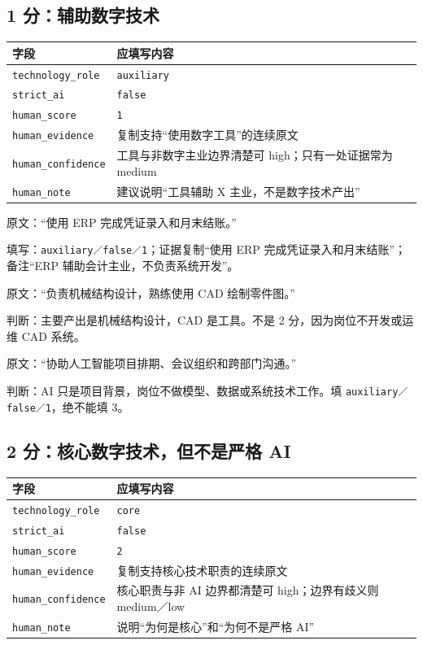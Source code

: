 \documentclass[11pt,a4paper,fontset=none]{ctexart}
\newcommand{\field}[1]{\nolinkurl{#1}}
\begin{document}
\subsection{1 分：辅助数字技术}

\noindent\begin{tabularx}{\textwidth}{L{3.1cm}Y}
\toprule
字段 & 应填写内容\\
\midrule
\field{technology_role} & \texttt{auxiliary}\\
\field{strict_ai} & \texttt{false}\\
\field{human_score} & \texttt{1}\\
\field{human_evidence} & 复制支持“使用数字工具”的连续原文\\
\field{human_confidence} & 工具与非数字主业边界清楚可 high；只有一处证据常为 medium\\
\field{human_note} & 建议说明“工具辅助 X 主业，不是数字技术产出”\\
\bottomrule
\end{tabularx}

\begin{examplebox}
原文：“使用 ERP 完成凭证录入和月末结账。”

填写：\texttt{auxiliary／false／1}；证据复制“使用 ERP 完成凭证录入和月末结账”；备注“ERP 辅助会计主业，不负责系统开发”。
\end{examplebox}

\begin{examplebox}
原文：“负责机械结构设计，熟练使用 CAD 绘制零件图。”

判断：主要产出是机械结构设计，CAD 是工具。不是 2 分，因为岗位不开发或运维 CAD 系统。
\end{examplebox}

\begin{examplebox}[1 分例 3：只协调 AI 项目]
原文：“协助人工智能项目排期、会议组织和跨部门沟通。”

判断：AI 只是项目背景，岗位不做模型、数据或系统技术工作。填 \texttt{auxiliary／false／1}，绝不能填 3。
\end{examplebox}

\subsection{2 分：核心数字技术，但不是严格 AI}

\noindent\begin{tabularx}{\textwidth}{L{3.1cm}Y}
\toprule
字段 & 应填写内容\\
\midrule
\field{technology_role} & \texttt{core}\\
\field{strict_ai} & \texttt{false}\\
\field{human_score} & \texttt{2}\\
\field{human_evidence} & 复制支持核心技术职责的连续原文\\
\field{human_confidence} & 核心职责与非 AI 边界都清楚可 high；边界有歧义则 medium／low\\
\field{human_note} & 说明“为何是核心”和“为何不是严格 AI”\\
\bottomrule
\end{tabularx}
\end{document}

